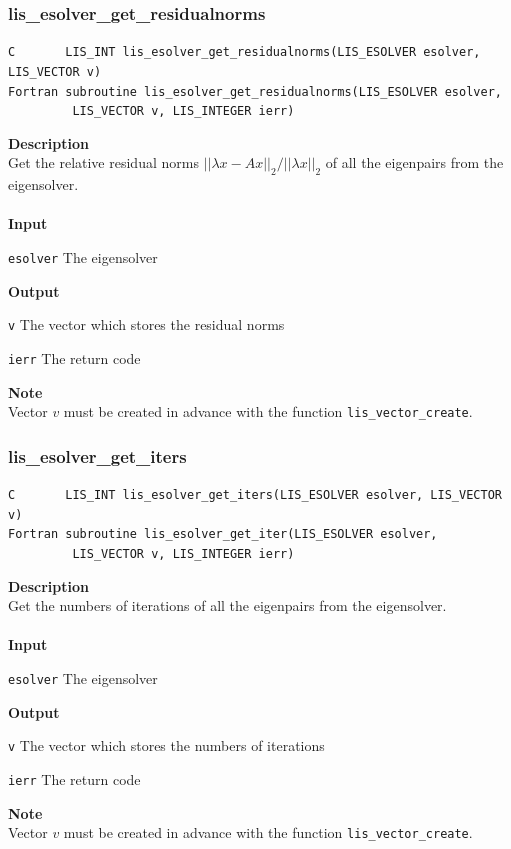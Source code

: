 \documentclass[a4paper]{article}
\newcommand{\namelistlabel}[1]{\mbox{#1}\hfill}
\newenvironment{namelist}[1]{%
\begin{list}{}
  {\let\makelabel\namelistlabel
  \settowidth{\labelwidth}{#1}
  \setlength{\leftmargin}{1.1\labelwidth}}
  }{%
\end{list}}
\begin{document}
\subsubsection{lis\_esolver\_get\_residualnorms}
\begin{screen}
\verb|C       LIS_INT lis_esolver_get_residualnorms(LIS_ESOLVER esolver, LIS_VECTOR v)|\\
\verb|Fortran subroutine lis_esolver_get_residualnorms(LIS_ESOLVER esolver,|\\
\verb|         LIS_VECTOR v, LIS_INTEGER ierr)|
\end{screen}
{\bf Description}\\
\indent
Get the relative residual norms $||\lambda x-Ax||_2/||\lambda x||_2$ of all the eigenpairs from the eigensolver.
\\ \\
\noindent
{\bf Input}
\begin{namelist}{XXXXXXXXXXXXXXXXXXXX}
\item[\tt esolver] The eigensolver
\end{namelist}
{\bf Output}
\begin{namelist}{XXXXXXXXXXXXXXXXXXXX}
\item[\tt v]  The vector which stores the residual norms
\item[\tt ierr] The return code
\end{namelist}
{\bf Note}\\
\indent
Vector $v$ must be created in advance with the function \verb|lis_vector_create|. 

\newpage
\subsubsection{lis\_esolver\_get\_iters}
\begin{screen}
\verb|C       LIS_INT lis_esolver_get_iters(LIS_ESOLVER esolver, LIS_VECTOR v)|\\
\verb|Fortran subroutine lis_esolver_get_iter(LIS_ESOLVER esolver, |\\
\verb|         LIS_VECTOR v, LIS_INTEGER ierr)|
\end{screen}
{\bf Description}\\
\indent
Get the numbers of iterations of all the eigenpairs from the eigensolver.
\\ \\
\noindent
{\bf Input}
\begin{namelist}{XXXXXXXXXXXXXXXXXXXX}
\item[\tt esolver] The eigensolver
\end{namelist}
{\bf Output}
\begin{namelist}{XXXXXXXXXXXXXXXXXXXX}
\item[\tt v]  The vector which stores the numbers of iterations
\item[\tt ierr] The return code
\end{namelist}
{\bf Note}\\
\indent
Vector $v$ must be created in advance with the function \verb|lis_vector_create|. 
\end{document}

